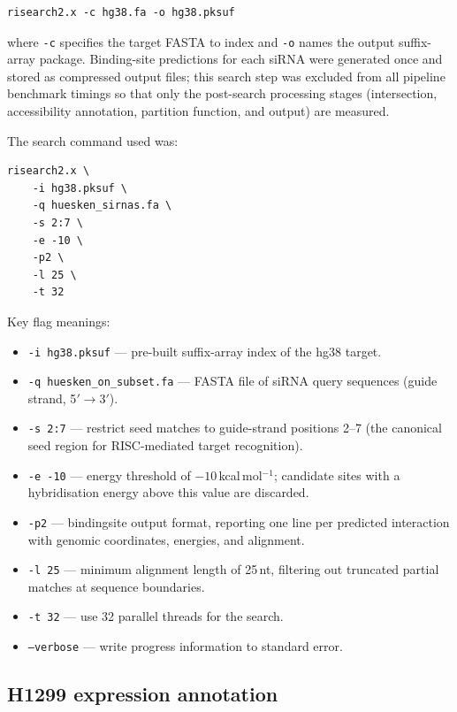 \begin{verbatim}
risearch2.x -c hg38.fa -o hg38.pksuf
\end{verbatim}

\noindent where \texttt{-c} specifies the target FASTA to index and \texttt{-o} names the output suffix-array package.
Binding-site predictions for each siRNA were generated once and stored as compressed output files; this search step was excluded from all pipeline benchmark timings so that only the post-search processing stages (intersection, accessibility annotation, partition function, and output) are measured.

The search command used was:

\begin{verbatim}
risearch2.x \
    -i hg38.pksuf \
    -q huesken_sirnas.fa \
    -s 2:7 \
    -e -10 \
    -p2 \
    -l 25 \
    -t 32
\end{verbatim}

\noindent Key flag meanings:
\begin{itemize}
  \item \texttt{-i hg38.pksuf} — pre-built suffix-array index of the
    hg38 target.
  \item \texttt{-q huesken\_on\_subset.fa} — FASTA file of siRNA query
    sequences (guide strand, 5$'$$\to$3$'$).
  \item \texttt{-s 2:7} — restrict seed matches to guide-strand positions
    2–7 (the canonical seed region for RISC-mediated target recognition).
  \item \texttt{-e -10} — energy threshold of $-10$\,kcal\,mol$^{-1}$;
    candidate sites with a hybridisation energy above this value are
    discarded.
  \item \texttt{-p2} — bindingsite output format, reporting one line per
    predicted interaction with genomic coordinates, energies, and alignment.
  \item \texttt{-l 25} — minimum alignment length of 25\,nt, filtering
    out truncated partial matches at sequence boundaries.
  \item \texttt{-t 32} — use 32 parallel threads for the search.
  \item \texttt{--verbose} — write progress information to standard error.
\end{itemize}

\subsection*{H1299 expression annotation}

